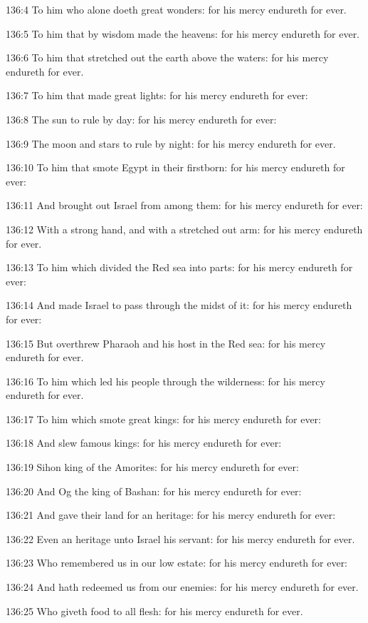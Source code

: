 136:4 To him who alone doeth great wonders: for his mercy endureth for
ever.

136:5 To him that by wisdom made the heavens: for his mercy endureth
for ever.

136:6 To him that stretched out the earth above the waters: for his
mercy endureth for ever.

136:7 To him that made great lights: for his mercy endureth for ever:

136:8 The sun to rule by day: for his mercy endureth for ever:

136:9 The moon and stars to rule by night: for his mercy endureth for
ever.

136:10 To him that smote Egypt in their firstborn: for his mercy
endureth for ever:

136:11 And brought out Israel from among them: for his mercy endureth
for ever:

136:12 With a strong hand, and with a stretched out arm: for his mercy
endureth for ever.

136:13 To him which divided the Red sea into parts: for his mercy
endureth for ever:

136:14 And made Israel to pass through the midst of it: for his mercy
endureth for ever:

136:15 But overthrew Pharaoh and his host in the Red sea: for his
mercy endureth for ever.

136:16 To him which led his people through the wilderness: for his
mercy endureth for ever.

136:17 To him which smote great kings: for his mercy endureth for
ever:

136:18 And slew famous kings: for his mercy endureth for ever:

136:19 Sihon king of the Amorites: for his mercy endureth for ever:

136:20 And Og the king of Bashan: for his mercy endureth for ever:

136:21 And gave their land for an heritage: for his mercy endureth for
ever:

136:22 Even an heritage unto Israel his servant: for his mercy
endureth for ever.

136:23 Who remembered us in our low estate: for his mercy endureth for
ever:

136:24 And hath redeemed us from our enemies: for his mercy endureth
for ever.

136:25 Who giveth food to all flesh: for his mercy endureth for ever.

